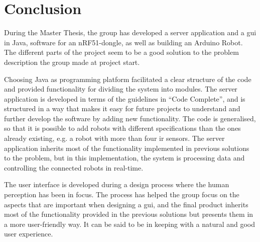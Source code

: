 \chapter{Conclusion}


During the Master Thesis, the group has developed a server application and a \acrlong{gui} in Java, software for an nRF51-dongle, as well as building an Arduino Robot. The different parts of the project seem to be a good solution to the problem description the group made at project start.

Choosing Java as programming platform facilitated a clear structure of the code and provided functionality for dividing the system into modules. The server application is developed in terms of the guidelines in ``Code Complete'', and is structured in a way that makes it easy for future projects to understand and further develop the software by adding new functionality. The code is generalised, so that it is possible to add robots with different specifications than the ones already existing, e.g. a robot with more than four \acrlong{ir} sensors. The server application inherits most of the functionality implemented in previous solutions to the problem, but in this implementation, the system is processing data and controlling the connected robots in real-time. 

The user interface is developed during a design process where the human perception has been in focus. The process has helped the group focus on the aspects that are important when designing a \acrshort{gui}, and the final product inherits most of the functionality provided in the previous solutions but presents them in a more user-friendly way. It can be said to be in keeping with a natural and good user experience.

